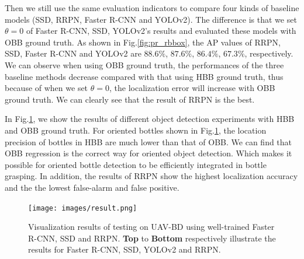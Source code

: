 Then we still use the same evaluation indicators to compare four kinds of baseline models (SSD, RRPN, Faster R-CNN and YOLOv2). The difference is that we set $ \theta = 0 $ of Faster R-CNN, SSD, YOLOv2's results and evaluated these models with OBB ground truth. As shown in Fig.\ref{fig:pr_rbbox}, the AP values of RRPN, SSD, Faster R-CNN and YOLOv2 are $ 88.6\% $, $ 87.6\% $, $ 86.4\% $, $ 67.3\% $, respectively. We can observe when using OBB ground truth, the performances of the three baseline methods decrease compared with that using HBB ground truth, thus because of when we set $ \theta = 0 $, the localization error will increase with OBB ground truth. We can clearly see that the result of RRPN is the best.

In Fig.\ref{fig:result}, we show the results of different object detection experiments with HBB and OBB ground truth. For oriented bottles shown in Fig.\ref{fig:result}, the location precision of bottles in HBB are much lower than that of OBB. We can find that OBB regression is the correct way for oriented object detection. Which makes it possible for oriented bottle detection to be efficiently integrated in bottle grasping. In addition, the results of RRPN show the highest localization accuracy and the the lowest false-alarm and false positive.


\begin{figure}
	\texttt{[image: images/result.png]}
	\caption{Visualization results of testing on UAV-BD using well-trained Faster R-CNN, SSD and RRPN. \textbf{Top} to \textbf{Bottom} respectively illustrate the results for Faster R-CNN, SSD, YOLOv2 and RRPN.}
	\label{fig:result}
\end{figure}







